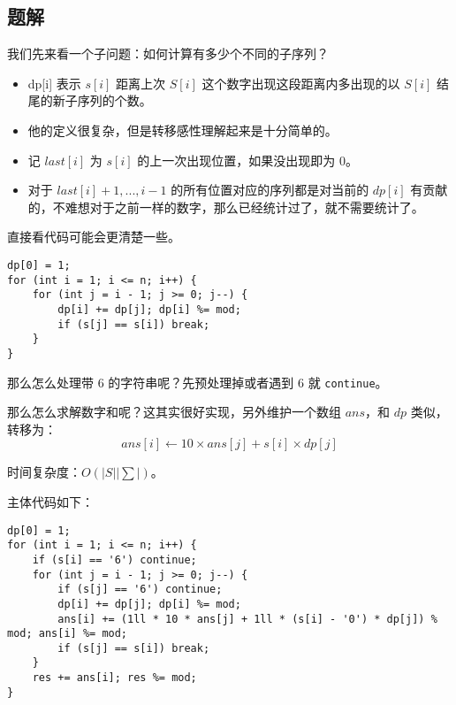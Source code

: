 \subsection{题解}
\begin{frame} %
我们先来看一个子问题：如何计算有多少个不同的子序列？

\begin{itemize}
    \item dp[i] 表示 $s[i]$ 距离上次 $S[i]$ 这个数字出现这段距离内多出现的以 $S[i]$ 结尾的新子序列的个数。
    \item 他的定义很复杂，但是转移感性理解起来是十分简单的。
    \item 记 $last[i]$ 为 $s[i]$ 的上一次出现位置，如果没出现即为 $0$。
    \item 对于 $last[i] + 1, ..., i - 1$ 的所有位置对应的序列都是对当前的 $dp[i]$ 有贡献的，不难想对于之前一样的数字，那么已经统计过了，就不需要统计了。
\end{itemize}
\end{frame}


\begin{frame}[fragile]
直接看代码可能会更清楚一些。

\begin{lstlisting}[style=C++]
dp[0] = 1;
for (int i = 1; i <= n; i++) {
    for (int j = i - 1; j >= 0; j--) {
        dp[i] += dp[j]; dp[i] %= mod;
        if (s[j] == s[i]) break;
    }
}
\end{lstlisting}
那么怎么处理带 $6$ 的字符串呢？先预处理掉或者遇到 $6$ 就 \texttt{continue}。
\end{frame}


\begin{frame}
那么怎么求解数字和呢？这其实很好实现，另外维护一个数组 $ans$，和 $dp$ 类似，转移为：
$$
ans[i]\leftarrow 10\times ans[j] + s[i]\times dp[j]
$$

时间复杂度：$O(|S||\sum|)$。
\end{frame}


\begin{frame}[fragile]
主体代码如下：
\begin{lstlisting}[style=C++]
dp[0] = 1;
for (int i = 1; i <= n; i++) {
    if (s[i] == '6') continue;
    for (int j = i - 1; j >= 0; j--) {
        if (s[j] == '6') continue;
        dp[i] += dp[j]; dp[i] %= mod;
        ans[i] += (1ll * 10 * ans[j] + 1ll * (s[i] - '0') * dp[j]) % mod; ans[i] %= mod;
        if (s[j] == s[i]) break;
    }
    res += ans[i]; res %= mod;
}
\end{lstlisting}
\end{frame}
